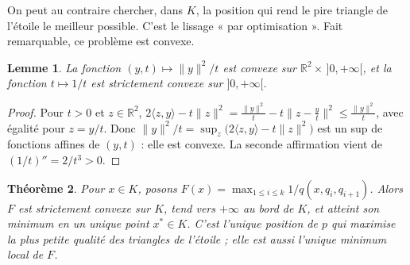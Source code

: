 \documentclass[11pt,a4paper]{article}
\theoremstyle{plain}
\newtheorem{theoreme}{Théorème}[section]
\newtheorem{lemme}[theoreme]{Lemme}
\theoremstyle{definition}
\theoremstyle{remark}
\newcommand{\R}{\mathbb{R}}
\begin{document}
On peut au contraire chercher, dans $K$, la position qui rend le pire triangle de l'étoile le meilleur possible. C'est le lissage « par optimisation ». Fait remarquable, ce problème est convexe.

\begin{lemme}\label{lem:perspective}
La fonction $(y,t)\mapsto\|y\|^2/t$ est convexe sur $\R^2\times\,]0,+\infty[$, et la fonction $t\mapsto1/t$ est strictement convexe sur $]0,+\infty[$.
\end{lemme}

\begin{proof}
Pour $t>0$ et $z\in\R^2$, $2\langle z,y\rangle-t\|z\|^2=\frac{\|y\|^2}t-t\big\|z-\frac yt\big\|^2\leq\frac{\|y\|^2}t$, avec égalité pour $z=y/t$. Donc $\|y\|^2/t=\sup_z\big(2\langle z,y\rangle-t\|z\|^2\big)$ est un sup de fonctions affines de $(y,t)$ : elle est convexe. La seconde affirmation vient de $(1/t)''=2/t^3>0$.
\end{proof}

\begin{theoreme}\label{thm:minmax}
Pour $x\in K$, posons $F(x)=\max_{1\leq i\leq k}1/q(x,q_i,q_{i+1})$. Alors $F$ est strictement convexe sur $K$, tend vers $+\infty$ au bord de $K$, et atteint son minimum en un unique point $x^*\in K$. C'est l'unique position de $p$ qui maximise la plus petite qualité des triangles de l'étoile ; elle est aussi l'unique minimum local de $F$.
\end{theoreme}
\end{document}
